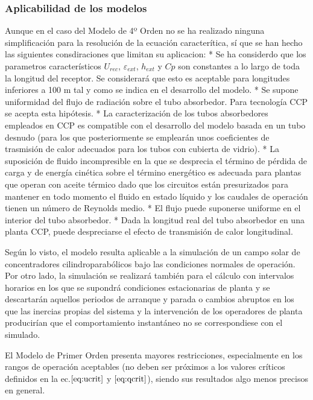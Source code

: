\documentclass[11pt]{article}
\begin{document}
\hypertarget{aplicabilidad-de-los-modelos}{%
\subsubsection{Aplicabilidad de los
modelos}\label{aplicabilidad-de-los-modelos}}

Aunque en el caso del Modelo de 4º Orden no se ha realizado ninguna
simplificación para la resolución de la ecuación caracterítica, sí que
se han hecho las siguientes consdiraciones que limitan su aplicacion: *
Se ha considerdo que los parametros característicos \(U_{rec}\),
\(\varepsilon_{ext}\), \(h_{ext}\) y \(Cp\) son constantes a lo largo de
toda la longitud del receptor. Se considerará que esto es aceptable para
longitudes inferiores a 100 m tal y como se indica en el desarrollo del
modelo. * Se supone uniformidad del flujo de radiación sobre el tubo
absorbedor. Para tecnología CCP se acepta esta hipótesis. * La
caracterización de los tubos absorbedores empleados en CCP es compatible
con el desarrollo del modelo basada en un tubo desnudo (para los que
posteriormente se emplearán unos coeficientes de trasmisión de calor
adecuados para los tubos con cubierta de vidrio). * La suposición de
fluido incompresible en la que se desprecia el término de pérdida de
carga y de energía cinética sobre el término energético es adecuada para
plantas que operan con aceite térmico dado que los circuitos están
presurizados para mantener en todo momento el fluido en estado líquido y
los caudales de operación tienen un número de Reynolds medio. * El flujo
puede suponerse uniforme en el interior del tubo absorbedor. * Dada la
longitud real del tubo absorbedor en una planta CCP, puede despreciarse
el efecto de transmisión de calor longitudinal.

Según lo visto, el modelo resulta aplicable a la simulación de un campo
solar de concentradores cilindroparabólicos bajo las condiciones
normales de operación. Por otro lado, la simulación se realizará también
para el cálculo con intervalos horarios en los que se supondrá
condiciones estacionarias de planta y se descartarán aquellos periodos
de arranque y parada o cambios abruptos en los que las inercias propias
del sistema y la intervención de los operadores de planta producirían
que el comportamiento instantáneo no se correspondiese con el simulado.

El Modelo de Primer Orden presenta mayores restricciones, especialmente
en los rangos de operación aceptables (no deben ser próximos a los
valores críticos definidos en la ec.\(\eqref{eq:ucrit}\) y
\(\eqref{eq:qcrit}\)), siendo sus resultados algo menos precisos en
general.
\end{document}
